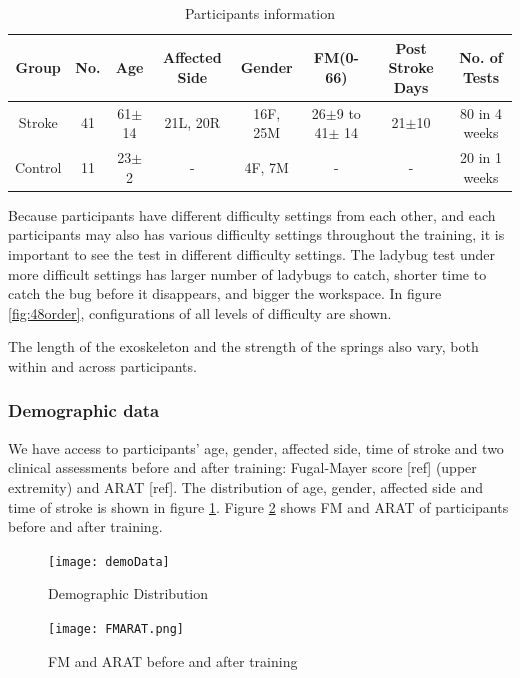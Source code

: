 \begin{table}[b]
	\begin{tabular}{c c c c c c c c}
	\hline
	Group & No. & Age & Affected Side & Gender & FM(0-66) & Post Stroke Days & No. of Tests\\
	\hline
	Stroke & 41 & 61$\pm$14 & 21L, 20R & 16F, 25M & 26$\pm$9 to 41$\pm$ 14 & 21$\pm$10 & 80 in 4 weeks \\ 
	Control & 11 & 23$\pm$2 & - & 4F, 7M & - & - & 20 in 1 weeks \\
	\hline
	\end{tabular}
	\caption{Participants information}
	\label{tab:demog}
\end{table}

Because participants have different difficulty settings from each other, and each participants may also has various difficulty settings throughout the training, it is important to see the test in different difficulty settings. 
The ladybug test under more difficult settings has larger number of ladybugs to catch, shorter time to catch the bug before it disappears, and bigger the workspace. 
In figure \ref{fig:48order}, configurations of all levels of difficulty are shown. 

The length of the exoskeleton and the strength of the springs also vary, both within and across participants.

\subsubsection{Demographic data}

We have access to participants' age, gender, affected side, time of stroke and two clinical assessments before and after training: Fugal-Mayer score [ref] (upper extremity) and ARAT [ref]. The distribution of age, gender, affected side and time of stroke is shown in figure \ref{fig:demoData}. Figure \ref{fig:FMARAT} shows FM and ARAT of participants before and after training.

\begin{figure} %
	\texttt{[image: demoData]}
	\centering
	\caption{Demographic Distribution}
	\medskip
	\small 
	\label{fig:demoData}
\end{figure}

\begin{figure} %
	\texttt{[image: FMARAT.png]}
	\centering
	\caption{FM and ARAT before and after training}
	\medskip
	\small 
	\label{fig:FMARAT}
\end{figure}


